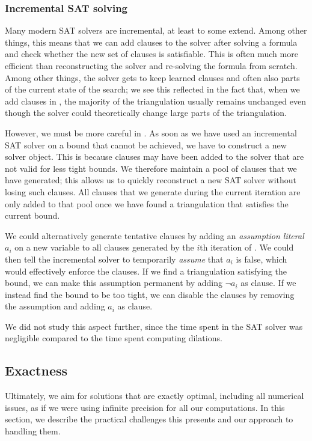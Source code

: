 \subsubsection{Incremental SAT solving}
\label{sec:incremental-sat-solving}
Many modern SAT solvers are incremental, at least to some extend.
Among other things, this means that we can add clauses to the solver after solving a formula and check whether the new set of clauses is satisfiable.
This is often much more efficient than reconstructing the solver and re-solving the formula from scratch.
Among other things, the solver gets to keep learned clauses and often also parts of the current state of the search;
we see this reflected in the fact that, when we add clauses in \incmdt{}, the majority of the triangulation usually remains unchanged
even though the solver could theoretically change large parts of the triangulation.

However, we must be more careful in \binmdt{}.
As soon as we have used an incremental SAT solver on a bound that cannot be achieved, we have to construct a new solver object.
This is because clauses may have been added to the solver that are not valid for less tight bounds.
We therefore maintain a pool of clauses that we have generated;
this allows us to quickly reconstruct a new SAT solver without losing such clauses.
All clauses that we generate during the current iteration are only added to that pool
once we have found a triangulation that satisfies the current bound.

We could alternatively generate tentative clauses by adding an \emph{assumption literal} $a_i$ on a new variable to all clauses generated by the $i$th iteration of \binmdt{}.
We could then tell the incremental solver to temporarily \emph{assume} that $a_i$ is false, which would effectively enforce the clauses.
If we find a triangulation satisfying the bound, we can make this assumption permanent by adding $\lnot a_i$ as clause.
If we instead find the bound to be too tight, we can disable the clauses by removing the assumption and adding $a_i$ as clause.

We did not study this aspect further, since the time spent in the SAT solver was negligible compared to the time spent computing dilations.

\subsection{Exactness}
\label{sec:exactness-implementation-issues}
Ultimately, we aim for solutions that are exactly optimal, including all numerical issues, as if we were using infinite precision for all our computations.
In this section, we describe the practical challenges this presents and our approach to handling them.

